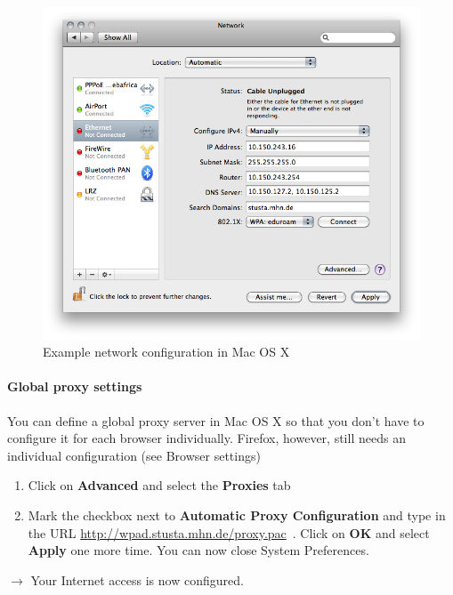 \documentclass[a4paper,12pt]{scrartcl}
\newcommand{\optemph}[1]{\textbf{#1}}
\begin{document}
\begin{enumerate}
\begin{figure}[h!]
\begin{minipage}[c]{0.38\linewidth}
        \end{minipage}
        \begin{minipage}[c]{0.60\linewidth}
          \centering
          \includegraphics[width=\linewidth,keepaspectratio]{Bilder/IP_Mac_EN}
          \caption{Example network configuration in Mac OS X}
        \end{minipage}
      \end{figure}
\end{enumerate}

\paragraph*{Global proxy settings}
You can define a global proxy server in Mac OS X so that you don't have to configure it for each browser individually. Firefox, however, still needs an individual configuration (see Browser settings)
\begin{enumerate}
	\item Click on \optemph{Advanced} and select the \optemph{Proxies} tab
	\item Mark the checkbox next to \optemph{Automatic Proxy Configuration} and type in the URL \url{http://wpad.stusta.mhn.de/proxy.pac}\ . Click on \optemph{OK} and select \optemph{Apply} one more time. You can now close System Preferences.
\end{enumerate}
$\rightarrow$ Your Internet access is now configured.
\end{document}
